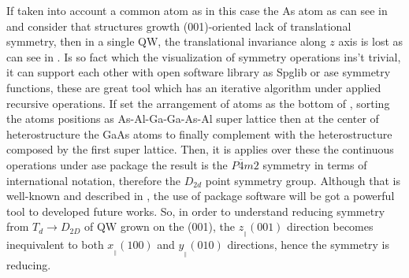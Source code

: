 If taken into account a common atom as in this case the As atom as can see in 
 and consider that structures growth (001)-oriented lack of translational symmetry\cite{ivchenko1996heavylight}, then in a single \gls{QW}, the translational invariance along $z$ axis is lost\cite{tronc2000bound} as can see in . Is so fact which the visualization of symmetry operations ins't trivial, it can support each other with  open software library as \gls{Spglib} or \gls{ase}  symmetry functions, these are great tool which has an iterative algorithm under applied recursive operations. If set the arrangement of atoms as the bottom of , sorting the atoms positions as As-Al-Ga-Ga-As-Al super lattice then at the center of heterostructure the GaAs atoms to finally complement with the heterostructure composed by the first super lattice. Then, it is applies over these the continuous operations under \gls{ase} package the result is the $P\overline{4}m2$ symmetry in terms of international notation, therefore the $D_{2d}$ point symmetry group. 
Although that is well-known and described in \cite{tronc2000bound,ivchenko1996heavylight,glazov2018electron,krebs1996giant,magri2000anticrossing,chen2002interface,ivchenko2008spinphoto}, the use of package software will be got a powerful tool to developed future works. So, in order to understand reducing symmetry from $T_{d}\to D_{2D}$ of QW grown on the (001), the $z_{_{\parallel}}(001)$ direction becomes inequivalent to both $x_{_{\parallel}}(100)$ and $y_{_{\parallel}}(010)$ directions, hence the symmetry is reducing. 

